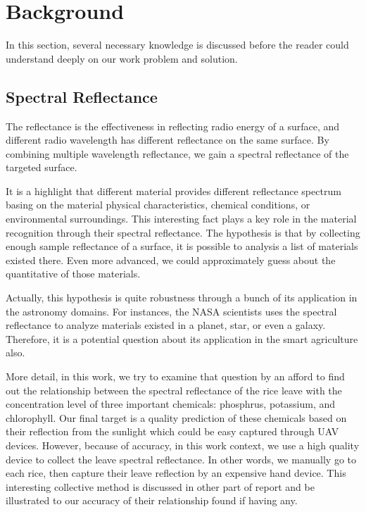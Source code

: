 \section{Background} \label{section:background}


In this section, several necessary knowledge is discussed before the reader could understand deeply on our work problem and solution.

\subsection{Spectral Reflectance}

The reflectance is the effectiveness in reflecting radio energy of a surface,
and different radio wavelength has different reflectance on the same surface.
By combining multiple wavelength reflectance,
we gain a spectral reflectance of the targeted surface.

It is a highlight that different material provides different reflectance spectrum
basing on the material physical characteristics, chemical conditions, or environmental surroundings.
This interesting fact plays a key role in the material recognition through their spectral reflectance.
The hypothesis is that by collecting enough sample reflectance of a surface,
it is possible to analysis a list of materials existed there.
Even more advanced, we could approximately guess about the quantitative of those materials.

Actually, this hypothesis is quite robustness
through a bunch of its application in the astronomy domains.
For instances, the NASA scientists uses the spectral reflectance
to analyze materials existed in a planet, star, or even a galaxy.
Therefore, it is a potential question about its application in the smart agriculture also.

More detail, in this work, we try to examine that question by
an afford to find out the relationship between
the spectral reflectance of the rice leave
with the concentration level of three important chemicals: phosphrus, potassium, and chlorophyll.
Our final target is a quality prediction of these chemicals based on their reflection from the sunlight
which could be easy captured through UAV devices.
However, because of accuracy, in this work context,
we use a high quality device to collect the leave spectral reflectance.
In other words, we manually go to each rice, then capture their leave reflection by an expensive hand device.
This interesting collective method is discussed in other part of report
and be illustrated to our accuracy of their relationship found if having any.

